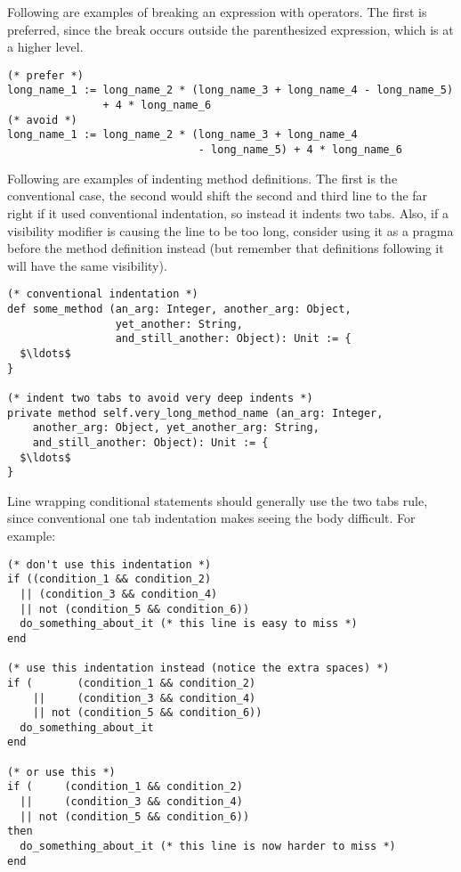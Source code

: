 \example Following are examples of breaking an expression with operators. The first is preferred, since the break occurs outside the parenthesized expression, which is at a higher level. 

\begin{lstlisting}
(* prefer *)
long_name_1 := long_name_2 * (long_name_3 + long_name_4 - long_name_5)
               + 4 * long_name_6
(* avoid *)
long_name_1 := long_name_2 * (long_name_3 + long_name_4 
                              - long_name_5) + 4 * long_name_6
\end{lstlisting}

\example Following are examples of indenting method definitions. The first is the conventional case, the second would shift the second and third line to the far right if it used conventional indentation, so instead it indents two tabs. Also, if a visibility modifier is causing the line to be too long, consider using it as a pragma before the method definition instead (but remember that definitions following it will have the same visibility). 

\begin{lstlisting}
(* conventional indentation *)
def some_method (an_arg: Integer, another_arg: Object, 
                 yet_another: String,
                 and_still_another: Object): Unit := {
  $\ldots$
}

(* indent two tabs to avoid very deep indents *)
private method self.very_long_method_name (an_arg: Integer,
    another_arg: Object, yet_another_arg: String, 
    and_still_another: Object): Unit := {
  $\ldots$
}
\end{lstlisting}

\example Line wrapping conditional statements should generally use the two tabs rule, since conventional one tab indentation makes seeing the body difficult. For example: 

\begin{lstlisting}
(* don't use this indentation *)
if ((condition_1 && condition_2)
  || (condition_3 && condition_4)
  || not (condition_5 && condition_6))
  do_something_about_it (* this line is easy to miss *)
end

(* use this indentation instead (notice the extra spaces) *)
if (       (condition_1 && condition_2)
    ||     (condition_3 && condition_4)
    || not (condition_5 && condition_6))
  do_something_about_it
end

(* or use this *)
if (     (condition_1 && condition_2)
  ||     (condition_3 && condition_4)
  || not (condition_5 && condition_6))
then
  do_something_about_it (* this line is now harder to miss *)
end
\end{lstlisting}

